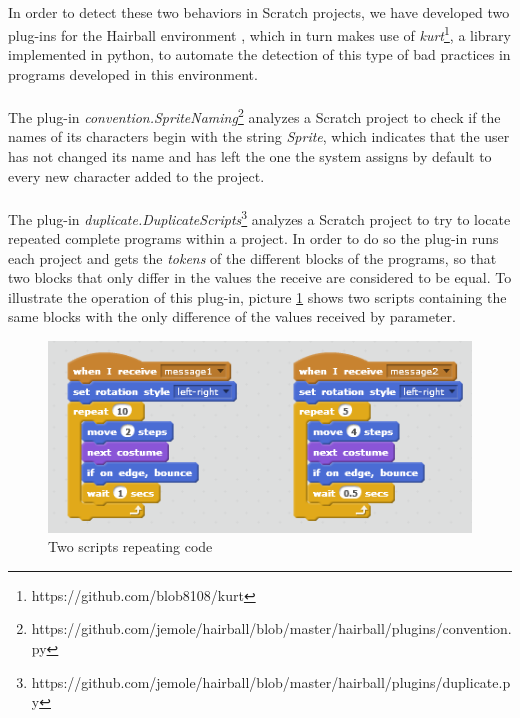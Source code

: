 \documentclass[a4paper,10pt]{article}
\begin{document}
\paragraph{}In order to detect these two behaviors in Scratch projects, we have developed two plug-ins for the Hairball environment \cite{boe2013hairball}, which in turn makes use of \textit{kurt}\footnote{https://github.com/blob8108/kurt}, a library implemented in python, to automate the detection of this type of bad practices in programs developed in this environment.
\paragraph{}The plug-in \textit{convention.SpriteNaming}\footnote{https://github.com/jemole/hairball/blob/master/hairball/plugins/convention.py} analyzes a Scratch project to check if the names of its characters begin with the string \textit{Sprite}, which indicates that the user has not changed its name and has left the one the system assigns by default to every new character added to the project.
\paragraph{}The plug-in \textit{duplicate.DuplicateScripts}\footnote{https://github.com/jemole/hairball/blob/master/hairball/plugins/duplicate.py} analyzes a Scratch project to try to locate repeated complete programs within a project. In order to do so the plug-in runs each project and gets the \textit{tokens} of the different blocks of the programs, so that two blocks that only differ in the values the receive are considered to be equal. To illustrate the operation of this plug-in, picture \ref{fig:CodeRepetition1} shows two scripts containing the same blocks with the only difference of the values received by parameter.
\begin{figure}
  \centering
    \includegraphics{img/CodeRepetition1.png}
  \caption{Two scripts repeating code}
  \label{fig:CodeRepetition1}
\end{figure}
\end{document}
